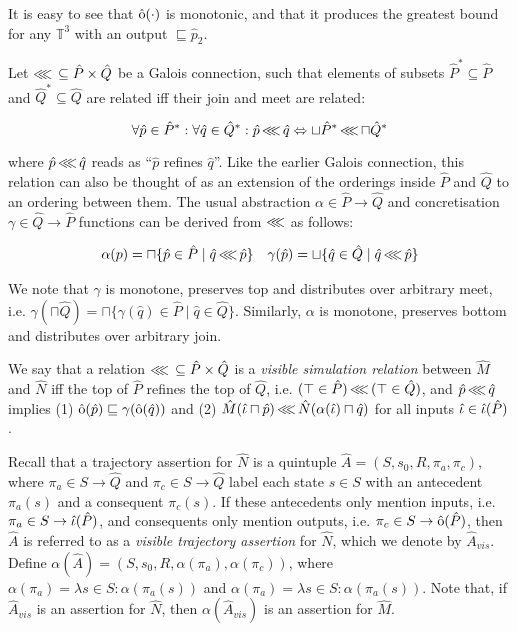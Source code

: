 \noindent It is easy to see that $\operatorname{\hat{\mathrm{o}}}(\cdot)$ is monotonic, and that it produces the greatest bound for any $\mathbb{T}^{3}$ with an output $\sqsubseteq \hat p_{2}$.

Let $\operatorname{\lll} \, \subseteq \hat P \times \hat Q$ be a Galois connection, such that elements of subsets $\hat P^{*} \subseteq \hat P$ and $\hat Q^{*} \subseteq \hat Q$ are related iff their join and meet are related:

\begin{equation*}
\forall \hat p \in \hat P^{*} : \forall \hat q \in \hat Q^{*} : \hat p \operatorname{\lll} \hat q \Leftrightarrow \sqcup \hat P^{*} \operatorname{\lll} \sqcap \hat Q^{*}
\end{equation*}

\noindent where $\hat p \operatorname{\lll} \hat q$ reads as ``$\hat p$ refines $\hat q$''. Like the earlier Galois connection, this relation can also be thought of as an extension of the orderings inside $\hat P$ and $\hat Q$ to an ordering between them. The usual abstraction $\alpha \in \hat P \rightarrow \hat Q$ and concretisation $\gamma \in \hat Q \rightarrow \hat P$ functions can be derived from $\operatorname{\lll}$ as follows:

\begin{align*}
\alpha(p) = \sqcap \{ \hat p \in \hat P \mid \hat q \operatorname{\lll} \hat p \} && \gamma(\hat p) = \sqcup \{ \hat q \in \hat Q \mid \hat q \operatorname{\lll} \hat p \}
\end{align*}

\noindent We note that $\gamma$ is monotone, preserves top and distributes over arbitrary meet, i.e. $\gamma(\sqcap \hat Q) = \sqcap \{ \gamma(\hat q) \in \hat P \mid \hat q \in \hat Q\}$. Similarly, $\alpha$ is monotone, preserves bottom and distributes over arbitrary join.

We say that a relation $\operatorname{\lll} \, \subseteq \hat P \times \hat Q$ is a \textit{visible simulation relation} between $\hat M$ and $\hat N$ iff the top of $\hat P$ refines the top of $\hat Q$, i.e. $(\top \in \hat P) \operatorname{\lll} \, (\top \in \hat Q)$, and $\hat p \operatorname{\lll} \hat q$ implies (1) $\operatorname{\hat{\mathrm{o}}}(\hat p) \sqsubseteq \gamma(\operatorname{\hat{\mathrm{o}}}(\hat q))$ and (2) $\hat M(\hat \iota \sqcap \hat p) \operatorname{\lll} \hat N(\alpha(\hat \iota) \sqcap \hat q)$ for all inputs $\hat \iota \in \operatorname{\hat{\iota}}(\hat P)$.

Recall that a trajectory assertion for $\hat N$ is a quintuple $\hat A = (S, s_{0}, R, \pi_{a}, \pi_{c})$, where $\pi_{a} \in S \rightarrow \hat Q$ and $\pi_{c} \in S \rightarrow \hat Q$ label each state $s \in S$ with an antecedent $\pi_{a}(s)$ and a consequent $\pi_{c}(s)$. If these antecedents only mention inputs, i.e. $\pi_{a} \in S \rightarrow \operatorname{\hat{\iota}}(\hat P)$, and consequents only mention outputs, i.e. $\pi_{c} \in S \rightarrow \operatorname{\hat{\mathrm{o}}}(\hat P)$, then $\hat A$ is referred to as a \textit{visible trajectory assertion} for $\hat N$, which we denote by $\hat A_{vis}$. Define $\alpha(\hat A) = (S, s_{0}, R, \alpha(\pi_{a}), \alpha(\pi_{c}))$, where $\alpha(\pi_{a}) = \lambda s \in S : \alpha(\pi_{a}(s))$ and $\alpha(\pi_{a}) = \lambda s \in S : \alpha(\pi_{a}(s))$. Note that, if $\hat A_{vis}$ is an assertion for $\hat N$, then $\alpha(\hat A_{vis})$ is an assertion for $\hat M$.

